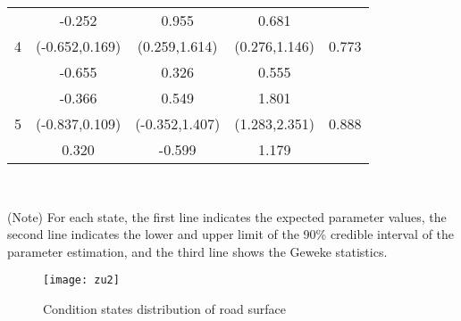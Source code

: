 \documentclass[Journal]{ascelike}
\begin{document}
\begin{table}[t]
\begin{center}
{\begin{tabular}{l|l|l|l|l}
\multicolumn{1}{c|}{} & \multicolumn{1}{c|}{-0.252} & \multicolumn{1}{c|}{0.955} & \multicolumn{1}{c|}{0.681} & \multicolumn{1}{c}{} \\ 
\multicolumn{1}{c|}{4} & \multicolumn{1}{c|}{(-0.652,0.169)} & \multicolumn{1}{c|}{(0.259,1.614)} & \multicolumn{1}{c|}{(0.276,1.146)} & \multicolumn{1}{c}{0.773} \\ 
\multicolumn{1}{c|}{} & \multicolumn{1}{c|}{-0.655} & \multicolumn{1}{c|}{0.326} & \multicolumn{1}{c|}{0.555} & \multicolumn{1}{c}{} \\ 
\hline
\multicolumn{1}{c|}{} & \multicolumn{1}{c|}{-0.366} & \multicolumn{1}{c|}{0.549} & \multicolumn{1}{c|}{1.801} & \multicolumn{1}{c}{} \\ 
\multicolumn{1}{c|}{5} & \multicolumn{1}{c|}{(-0.837,0.109)} & \multicolumn{1}{c|}{(-0.352,1.407)} & \multicolumn{1}{c|}{(1.283,2.351)} & \multicolumn{1}{c}{0.888} \\ 
\multicolumn{1}{c|}{} & \multicolumn{1}{c|}{0.320} & \multicolumn{1}{c|}{-0.599} & \multicolumn{1}{c|}{1.179} & \multicolumn{1}{c}{} \\ 
\hline
\end{tabular}
}\\
\end{center}
\small (Note) For each state, the first line indicates the expected parameter values, the second line indicates the lower and upper limit of the 90\% credible interval of the parameter estimation, and the third line shows the Geweke statistics.
\end{table}
%

\begin{figure}[t]
\centering
\texttt{[image: zu2]}\\
\caption{Condition states distribution of road surface}
\label{4dis}
\end{figure}
\end{document}
